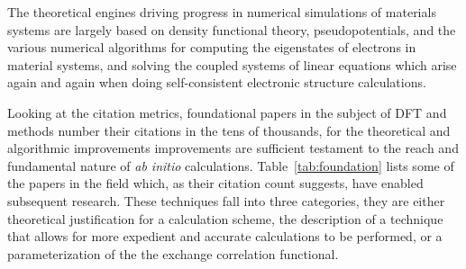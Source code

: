 The theoretical engines driving progress in numerical simulations of materials systems are
largely based on density functional theory, pseudopotentials, and the various numerical algorithms
for computing the eigenstates of electrons in material systems, and solving the coupled systems
of linear equations which arise again and again when doing self-consistent 
electronic structure calculations.

Looking at the citation metrics, foundational papers in the subject
of DFT and methods number their citations in the tens of thousands, for the 
theoretical and algorithmic improvements improvements are sufficient testament 
to the reach and fundamental nature of {\it ab initio} calculations. 
Table~\ref{tab:foundation} lists some of the papers in the field which, as
their citation count suggests, have enabled subsequent research. These techniques fall into
three categories, they are either theoretical justification for a calculation scheme, the description of
a technique that allows for more expedient and accurate calculations to be performed, or a parameterization
of the the exchange correlation functional.


